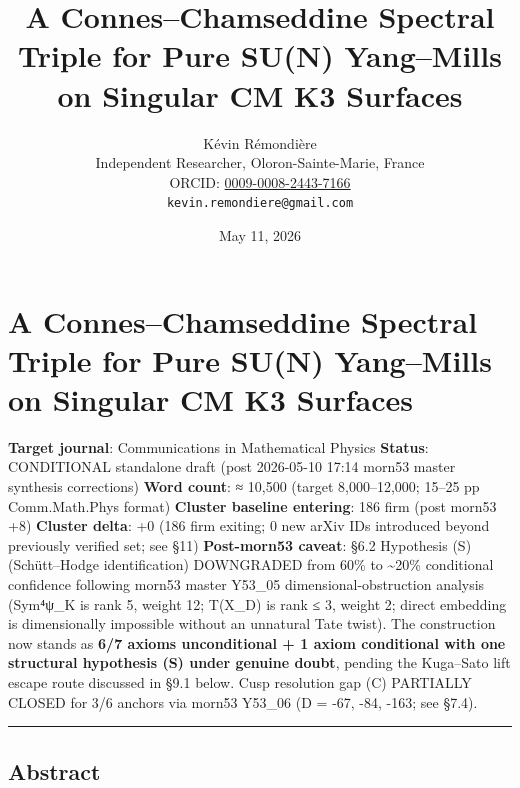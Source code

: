 \documentclass[
  11pt,
  a4paper,
]{amsart}
\title{A Connes--Chamseddine Spectral Triple for Pure SU(N) Yang--Mills on Singular CM K3 Surfaces}
\author{K\'evin R\'emondi\`ere\\
\small Independent Researcher, Oloron-Sainte-Marie, France\\
\small ORCID: \href{https://orcid.org/0009-0008-2443-7166}{0009-0008-2443-7166}\\
\small \texttt{kevin.remondiere@gmail.com}}
\date{May 11, 2026}
\begin{document}
\maketitle

\hypertarget{a-conneschamseddine-spectral-triple-for-pure-sun-yangmills-on-singular-cm-k3-surfaces}{%
\section{A Connes--Chamseddine Spectral Triple for Pure SU(N) Yang--Mills on Singular CM K3 Surfaces}\label{a-conneschamseddine-spectral-triple-for-pure-sun-yangmills-on-singular-cm-k3-surfaces}}

\textbf{Target journal}: Communications in Mathematical Physics
\textbf{Status}: CONDITIONAL standalone draft (post 2026-05-10 17:14 morn53 master synthesis corrections)
\textbf{Word count}: ≈ 10,500 (target 8,000--12,000; 15--25 pp Comm.Math.Phys format)
\textbf{Cluster baseline entering}: 186 firm (post morn53 +8)
\textbf{Cluster delta}: +0 (186 firm exiting; 0 new arXiv IDs introduced beyond previously verified set; see §11)
\textbf{Post-morn53 caveat}: §6.2 Hypothesis (S) (Schütt--Hodge identification) DOWNGRADED from 60\% to \textasciitilde20\% conditional confidence following morn53 master Y53\_05 dimensional-obstruction analysis (Sym⁴ψ\_K is rank 5, weight 12; T(X\_D) is rank ≤ 3, weight 2; direct embedding is dimensionally impossible without an unnatural Tate twist). The construction now stands as \textbf{6/7 axioms unconditional + 1 axiom conditional with one structural hypothesis (S) under genuine doubt}, pending the Kuga--Sato lift escape route discussed in §9.1 below. Cusp resolution gap (C) PARTIALLY CLOSED for 3/6 anchors via morn53 Y53\_06 (D = -67, -84, -163; see §7.4).

\begin{center}\rule{0.5\linewidth}{0.5pt}\end{center}

\hypertarget{abstract}{%
\subsection{Abstract}\label{abstract}}
\end{document}
